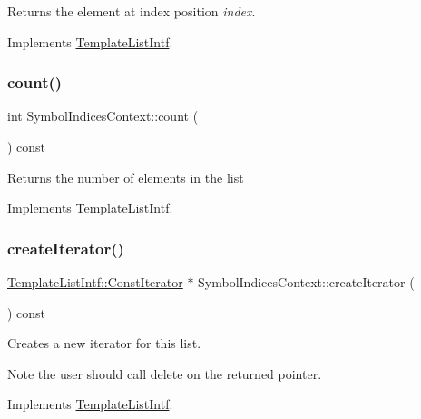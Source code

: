 Returns the element at index position {\itshape index}. 

Implements \mbox{\hyperlink{class_template_list_intf_aa51e57e72eacf4e8ce1055ee30a0f7f8}{Template\+List\+Intf}}.

\mbox{\label{class_symbol_indices_context_a2870f659954519c255fb67ac97ca04d6}} 
\subsubsection{\texorpdfstring{count()}{count()}}
{\footnotesize\ttfamily int Symbol\+Indices\+Context\+::count (\begin{DoxyParamCaption}{ }\end{DoxyParamCaption}) const\hspace{0.3cm}{\ttfamily [virtual]}}

Returns the number of elements in the list 

Implements \mbox{\hyperlink{class_template_list_intf_a329e49e33484c2aa5106aac1bf4e5216}{Template\+List\+Intf}}.

\mbox{\label{class_symbol_indices_context_ad0b75214155417ec6ce8477a6a607103}} 
\subsubsection{\texorpdfstring{createIterator()}{createIterator()}}
{\footnotesize\ttfamily \mbox{\hyperlink{class_template_list_intf_1_1_const_iterator}{Template\+List\+Intf\+::\+Const\+Iterator}} $\ast$ Symbol\+Indices\+Context\+::create\+Iterator (\begin{DoxyParamCaption}{ }\end{DoxyParamCaption}) const\hspace{0.3cm}{\ttfamily [virtual]}}

Creates a new iterator for this list. \begin{DoxyNote}{Note}
the user should call delete on the returned pointer. 
\end{DoxyNote}


Implements \mbox{\hyperlink{class_template_list_intf_a56b82384db24c3e121076a1da046d378}{Template\+List\+Intf}}.

